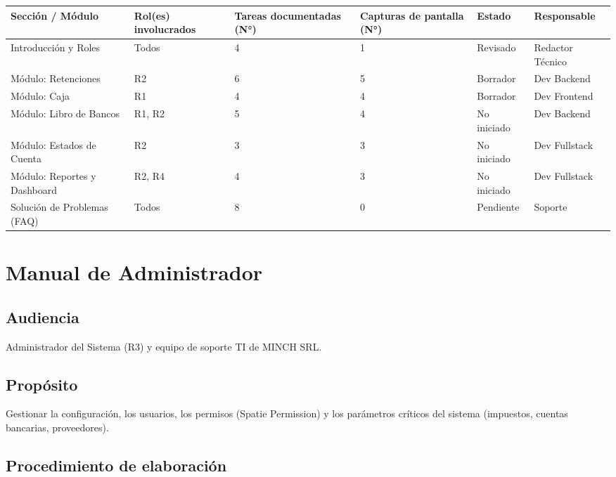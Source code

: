 \documentclass[stu]{apa7}
\begin{document}
\begin{longtable}{|L{3cm}|L{2.5cm}|C{2cm}|C{2cm}|C{2cm}|L{2.5cm}|}
\hline
{}
\textbf{Sección / Módulo} & \textbf{Rol(es) involucrados} & \textbf{Tareas documentadas (N°)} & \textbf{Capturas de pantalla (N°)} & \textbf{Estado} & \textbf{Responsable} \\
\hline
Introducción y Roles & Todos & 4 & 1 & Revisado & Redactor Técnico \\
\hline
Módulo: Retenciones & R2 & 6 & 5 & Borrador & Dev Backend \\
\hline
Módulo: Caja & R1 & 4 & 4 & Borrador & Dev Frontend \\
\hline
Módulo: Libro de Bancos & R1, R2 & 5 & 4 & No iniciado & Dev Backend \\
\hline
Módulo: Estados de Cuenta & R2 & 3 & 3 & No iniciado & Dev Fullstack \\
\hline
Módulo: Reportes y Dashboard & R2, R4 & 4 & 3 & No iniciado & Dev Fullstack \\
\hline
Solución de Problemas (FAQ) & Todos & 8 & 0 & Pendiente & Soporte \\
\hline
\end{longtable}

\newpage

\section{Manual de Administrador}

\subsection{Audiencia}

Administrador del Sistema (R3) y equipo de soporte TI de MINCH SRL.

\subsection{Propósito}

Gestionar la configuración, los usuarios, los permisos (Spatie Permission) y los parámetros críticos del sistema (impuestos, cuentas bancarias, proveedores).

\subsection{Procedimiento de elaboración}
\end{document}
